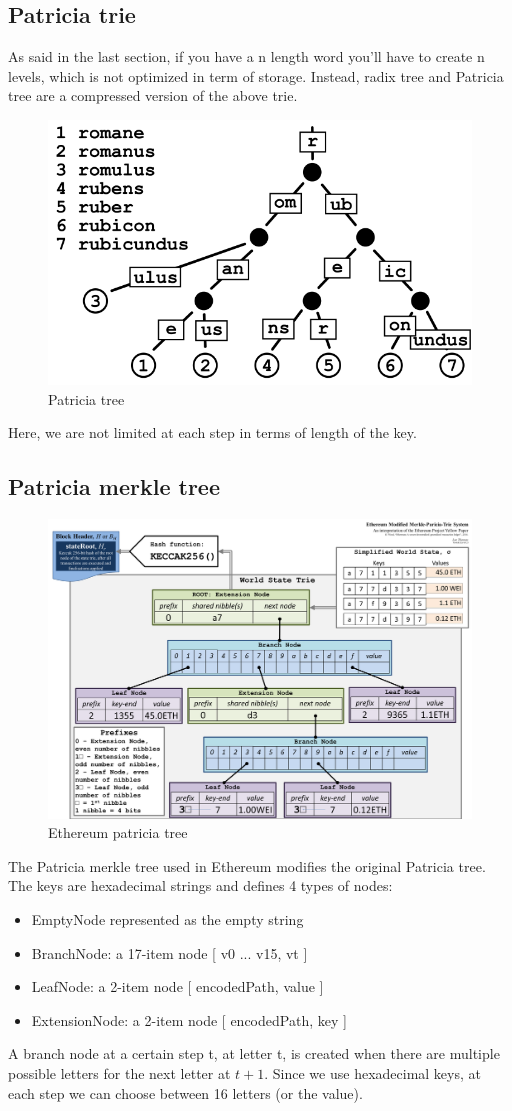 \subsection{Patricia trie}
As said in the last section, if you have a n length word you'll have to create n levels, which is not optimized in term of storage. 
Instead, radix tree and Patricia tree are a compressed version of the above trie.
\begin{figure}[H]
    \centering
\includegraphics[width=0.4\linewidth]{background/patricia.png}
    \caption{Patricia tree}
    \label{fig:patricia}
\end{figure}
Here, we are not limited at each step in terms of length of the key.

\subsection{Patricia merkle tree}

\begin{figure}[H]
    \centering
\includegraphics[width=0.9\linewidth]{background/ethereum_mpt.png}
    \caption{Ethereum patricia tree}
    \label{fig:eth_mpt}
\end{figure}

The Patricia merkle tree used in Ethereum modifies the original Patricia tree. The keys are hexadecimal strings and defines 4 types of nodes: 
\begin{itemize}
    \item EmptyNode represented as the empty string
    \item BranchNode: a 17-item node [ v0 ... v15, vt ]
    \item LeafNode: a 2-item node [ encodedPath, value ]
    \item ExtensionNode: a 2-item node [ encodedPath, key ]
\end{itemize}
A branch node at a certain step t, at letter t, is created when there are multiple possible letters for the next letter at $t+1$. Since we use hexadecimal keys, at each step we can choose between 16 letters (or the value).

